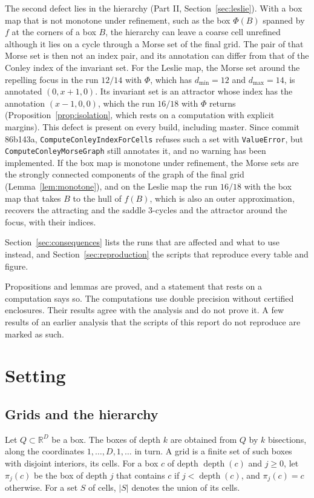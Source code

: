 \documentclass[11pt]{article}
\theoremstyle{plain}
\theoremstyle{definition}
\theoremstyle{remark}
\DeclareMathOperator{\depth}{depth}
\newcommand{\R}{\mathbb{R}}
\newcommand{\dmin}{d_{\min}}
\newcommand{\dmax}{d_{\max}}
\newcommand{\code}[1]{\texttt{#1}}
\begin{document}
The second defect lies in the hierarchy (Part II, Section~\ref{sec:leslie}). With a box map that is not monotone under refinement, such as the box $\Phi(B)$ spanned by $f$ at the corners of a box $B$, the hierarchy can leave a coarse cell unrefined although it lies on a cycle through a Morse set of the final grid. The pair of that Morse set is then not an index pair, and its annotation can differ from that of the Conley index of the invariant set. For the Leslie map, the Morse set around the repelling focus in the run $12/14$ with $\Phi$, which has $\dmin=12$ and $\dmax=14$, is annotated $(0,x+1,0)$. Its invariant set is an attractor whose index has the annotation $(x-1,0,0)$, which the run $16/18$ with $\Phi$ returns (Proposition~\ref{prop:isolation}, which rests on a computation with explicit margins). This defect is present on every build, including master. Since commit 86b143a, \code{ComputeConleyIndexForCells} refuses such a set with \code{ValueError}, but \code{ComputeConleyMorseGraph} still annotates it, and no warning has been implemented. If the box map is monotone under refinement, the Morse sets are the strongly connected components of the graph of the final grid (Lemma~\ref{lem:monotone}), and on the Leslie map the run $16/18$ with the box map that takes $B$ to the hull of $f(B)$, which is also an outer approximation, recovers the attracting and the saddle $3$-cycles and the attractor around the focus, with their indices.

Section~\ref{sec:consequences} lists the runs that are affected and what to use instead, and Section~\ref{sec:reproduction} the scripts that reproduce every table and figure.

Propositions and lemmas are proved, and a statement that rests on a computation says so. The computations use double precision without certified enclosures. Their results agree with the analysis and do not prove it. A few results of an earlier analysis that the scripts of this report do not reproduce are marked as such.

\section{Setting}\label{sec:setting}

\subsection{Grids and the hierarchy}\label{sec:hierarchy}

Let $Q\subset\R^D$ be a box. The boxes of depth $k$ are obtained from $Q$ by $k$ bisections, along the coordinates $1,\dots,D,1,\dots$ in turn. A grid is a finite set of such boxes with disjoint interiors, its cells. For a box $c$ of depth $\depth(c)$ and $j\geq0$, let $\pi_j(c)$ be the box of depth $j$ that contains $c$ if $j<\depth(c)$, and $\pi_j(c)=c$ otherwise. For a set $S$ of cells, $|S|$ denotes the union of its cells.
\end{document}
